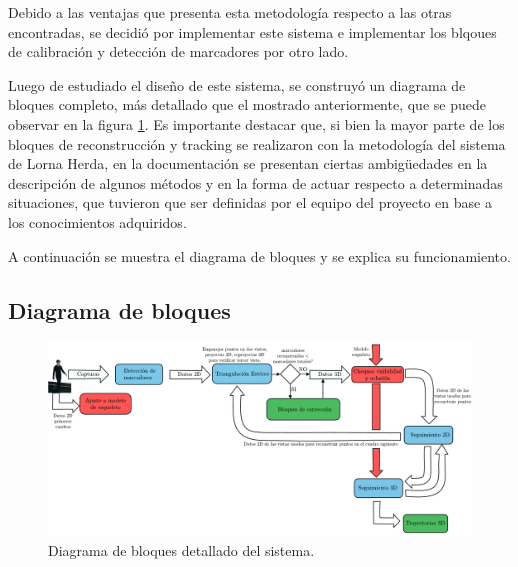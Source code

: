 Debido a las ventajas que presenta esta metodología respecto a las otras encontradas, se decidió por implementar este sistema e implementar los blqoues de calibración y detección de marcadores por otro lado.

Luego de estudiado el diseño de este sistema, se construyó un diagrama de bloques completo, más detallado que el mostrado anteriormente, que se puede observar en la figura \ref{diagBloq}. Es importante destacar que, si bien la mayor parte de los bloques de reconstrucción y tracking se realizaron con la metodología del sistema de Lorna Herda\cite{herda}, en la documentación se presentan ciertas ambigüedades en la descripción de algunos métodos y en la forma de actuar respecto a determinadas situaciones, que tuvieron que ser definidas por el equipo del proyecto en base a los conocimientos adquiridos.

A continuación se muestra el diagrama de bloques y se explica su funcionamiento.

\subsection{Diagrama de bloques}
\vspace{-1cm}
\begin{figure}[ht!]
\begin{center}
\includegraphics[scale=0.65]{img/Sistema_completo/Diagramadebloques_Herda.pdf}
\end{center}
\vspace{-1cm}
\caption{Diagrama de bloques detallado del sistema.}
\label{diagBloq}
\end{figure}

